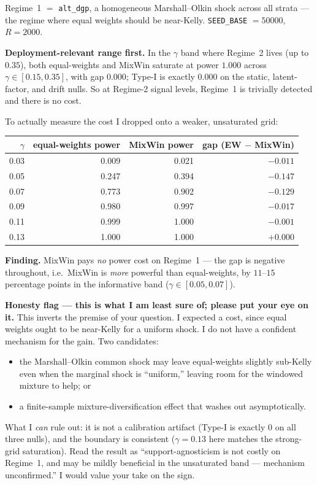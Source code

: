 \documentclass[11pt,a4paper]{article}
\begin{document}
Regime~1 $=$ \texttt{alt\_dgp}, a homogeneous Marshall--Olkin shock across all
strata --- the regime where equal weights should be near-Kelly.
\texttt{SEED\_BASE} $= 50000$, $R = 2000$.

\medskip
\noindent\textbf{Deployment-relevant range first.} In the $\gamma$ band where
Regime~2 lives (up to $0.35$), both equal-weights and MixWin saturate at power
$1.000$ across $\gamma \in [0.15, 0.35]$, with gap $0.000$; Type-I is exactly
$0.000$ on the static, latent-factor, and drift nulls. So at Regime-2 signal
levels, Regime~1 is trivially detected and there is no cost.

\medskip
\noindent To actually measure the cost I dropped onto a weaker, unsaturated
grid:
\medskip
\begin{center}
\begin{tabular}{rrrr}
\toprule
$\gamma$ & equal-weights power & MixWin power & gap (EW $-$ MixWin) \\
\midrule
0.03 & 0.009 & 0.021 & $-0.011$ \\
0.05 & 0.247 & 0.394 & $-0.147$ \\
0.07 & 0.773 & 0.902 & $-0.129$ \\
0.09 & 0.980 & 0.997 & $-0.017$ \\
0.11 & 0.999 & 1.000 & $-0.001$ \\
0.13 & 1.000 & 1.000 & $+0.000$ \\
\bottomrule
\end{tabular}
\end{center}
\medskip

\noindent\textbf{Finding.} MixWin pays \emph{no} power cost on Regime~1 --- the
gap is negative throughout, i.e.\ MixWin is \emph{more} powerful than
equal-weights, by $11$--$15$ percentage points in the informative band
($\gamma \in [0.05, 0.07]$).

\medskip
\noindent\textbf{Honesty flag --- this is what I am least sure of; please put
your eye on it.} This inverts the premise of your question. I expected a cost,
since equal weights ought to be near-Kelly for a uniform shock. I do not have a
confident mechanism for the gain. Two candidates:
\begin{itemize}
\item[(i)] the Marshall--Olkin common shock may leave equal-weights slightly
  sub-Kelly even when the marginal shock is ``uniform,'' leaving room for the
  windowed mixture to help; or
\item[(ii)] a finite-sample mixture-diversification effect that washes out
  asymptotically.
\end{itemize}
What I \emph{can} rule out: it is not a calibration artifact (Type-I is exactly
$0$ on all three nulls), and the boundary is consistent ($\gamma = 0.13$ here
matches the strong-grid saturation). Read the result as ``support-agnosticism is
not costly on Regime~1, and may be mildly beneficial in the unsaturated band ---
mechanism unconfirmed.'' I would value your take on the sign.
\end{document}
